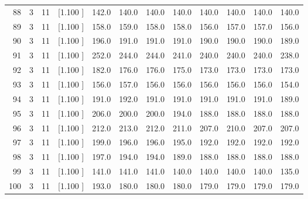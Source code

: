 \documentclass[12pt,a4paper]{article}
\begin{document}
\begin{center}
{\begin{tabular}{r r r r r r r r r r r r}
  88&  3& 11&[1.100     ]&   142.0&   140.0&   140.0&   140.0&   140.0&   140.0&   140.0&   140.0\\[-0.02in]
  89&  3& 11&[1.100     ]&   158.0&   159.0&   158.0&   158.0&   156.0&   157.0&   157.0&   156.0\\[-0.02in]
  90&  3& 11&[1.100     ]&   196.0&   191.0&   191.0&   191.0&   190.0&   190.0&   190.0&   189.0\\[-0.02in]
  91&  3& 11&[1.100     ]&   252.0&   244.0&   244.0&   241.0&   240.0&   240.0&   240.0&   238.0\\[-0.02in]
  92&  3& 11&[1.100     ]&   182.0&   176.0&   176.0&   175.0&   173.0&   173.0&   173.0&   173.0\\[-0.02in]
  93&  3& 11&[1.100     ]&   156.0&   157.0&   156.0&   156.0&   156.0&   156.0&   156.0&   154.0\\[-0.02in]
  94&  3& 11&[1.100     ]&   191.0&   192.0&   191.0&   191.0&   191.0&   191.0&   191.0&   189.0\\[-0.02in]
  95&  3& 11&[1.100     ]&   206.0&   200.0&   200.0&   194.0&   188.0&   188.0&   188.0&   188.0\\[-0.02in]
  96&  3& 11&[1.100     ]&   212.0&   213.0&   212.0&   211.0&   207.0&   210.0&   207.0&   207.0\\[-0.02in]
  97&  3& 11&[1.100     ]&   199.0&   196.0&   196.0&   195.0&   192.0&   192.0&   192.0&   192.0\\[-0.02in]
  98&  3& 11&[1.100     ]&   197.0&   194.0&   194.0&   189.0&   188.0&   188.0&   188.0&   188.0\\[-0.02in]
  99&  3& 11&[1.100     ]&   141.0&   141.0&   141.0&   140.0&   140.0&   140.0&   140.0&   135.0\\[-0.02in]
 100&  3& 11&[1.100     ]&   193.0&   180.0&   180.0&   180.0&   179.0&   179.0&   179.0&   179.0\\[-0.02in]

\hline
\end{tabular}}
\end{center}
\end{document}
